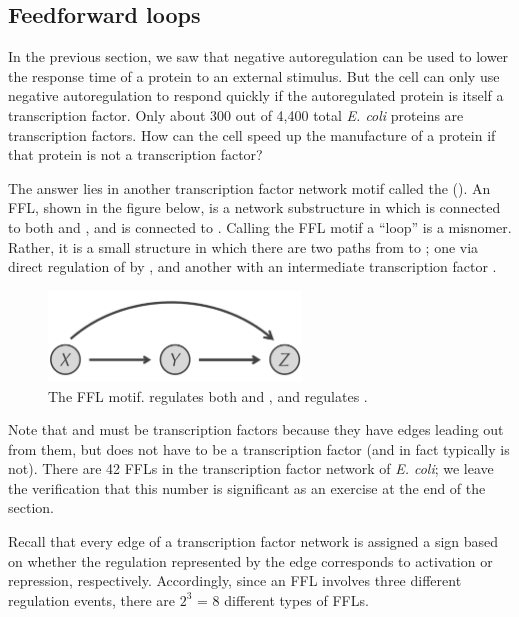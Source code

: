 \subsection{Feedforward loops}

In the previous section, we saw that negative autoregulation can be used to lower the response time of a protein to an external stimulus. But the cell can only use negative autoregulation to respond quickly if the autoregulated protein is itself a transcription factor. Only about 300 out of 4,400 total \textit{E. coli} proteins are transcription factors. How can the cell speed up the manufacture of a protein if that protein is not a transcription factor?

The answer lies in another transcription factor network motif called the  (). An FFL, shown in the figure below, is a network substructure in which  is connected to both  and , and  is connected to . Calling the FFL motif a ``loop'' is a misnomer. Rather, it is a small structure in which there are two paths from  to ; one via direct regulation of  by , and another with an intermediate transcription factor .\\

\begin{figure}[h]
\centering
\mySfFamily
\includegraphics[width = 0.6\textwidth]{../images/feed-forward_loop.png}
\caption{The FFL motif.  regulates both  and , and  regulates .}
\label{fig:feed-forward_loop}
\end{figure}

Note that  and  must be transcription factors because they have edges leading out from them, but  does not have to be a transcription factor (and in fact typically is not). There are 42 FFLs in the transcription factor network of \textit{E. coli}; we leave the verification that this number is significant as an exercise at the end of the section.

Recall that every edge of a transcription factor network is assigned a sign based on whether the regulation represented by the edge corresponds to activation or repression, respectively. Accordingly, since an FFL involves three different regulation events, there are $2^3$ = 8 different types of FFLs.

